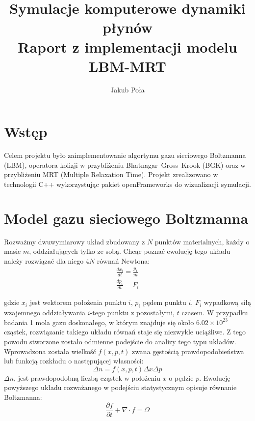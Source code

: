 \documentclass[a4paper,11pt,twoside]{article}
\date{}
\title{\Huge Symulacje komputerowe dynamiki płynów \\
 \Large Raport z implementacji modelu LBM-MRT}
\author{Jakub Poła}
\begin{document}
\maketitle
\thispagestyle{firststyle}
\newpage
\tableofcontents
\newpage

\section{Wstęp}
Celem projektu było zaimplementowanie algortymu gazu sieciowego Boltzmanna (LBM), operatora kolizji w przybliżeniu Bhatnagar–Gross–Krook (BGK) \cite{BGK} oraz w przybliżeniu MRT (Multiple Relaxation Time). Projekt zrealizowano w technologii C++ wykorzystując pakiet openFrameworks \cite{OpenFrameworks} do wizualizacji symulacji.

\section{Model gazu sieciowego Boltzmanna}
Rozważmy dwuwymiarowy układ zbudowany z $N$ punktów materialnych, każdy o masie $m$, oddziałujących tylko ze sobą. Chcąc poznać ewolucję tego układu należy rozwiązać dla niego $4N$ równań Newtona:
\begin{eqnarray}
\frac{dx_i}{dt} = \frac{p_i}{m} \\
\label{NewtEq1}
\frac{dp_i}{dt} = F_i
\label{NewtEq2}
\end{eqnarray}

gdzie $x_i$ jest wektorem położenia punktu $i$, $p_i$ pędem punktu $i$, $F_i$ wypadkową siłą wzajemnego oddziaływania $i$-tego punktu z pozostałymi, $t$ czasem. W przypadku badania 1 mola gazu doskonałego, w którym znajduje się około $6.02 \times 10^{23}$ cząstek, rozwiązanie takiego układu równań staje się niezwykle uciążliwe. Z tego powodu stworzone zostało odmienne podejście do analizy tego typu układów. Wprowadzona została wielkość $f(x, p, t)$ zwana gęstością prawdopodobieństwa lub funkcją rozkładu o następującej własności:
\begin{equation}
\Delta n = f(x, p, t)\Delta x \Delta p
\label{dist_particles}
\end{equation}
$\Delta n$, jest prawdopodobną liczbą cząstek w położeniu $x$ o pędzie $p$. Ewolucję powyższego układu rozważanego w podejściu statystycznym opisuje równanie Boltzmanna:
\begin{equation}
\frac{\partial f}{\partial t} + \nabla \cdot f = \Omega
\label{Boltzmann_eq}
\end{equation}
\end{document}
